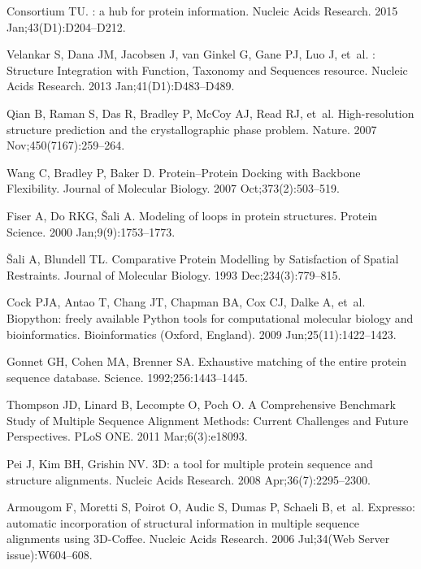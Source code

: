 \documentclass[10pt,letterpaper]{article}
\begin{document}
\begin{thebibliography}{100}
Consortium TU.
: a hub for protein information.
\newblock Nucleic Acids Research. 2015 Jan;43(D1):D204--D212.

Velankar S, Dana JM, Jacobsen J, van Ginkel G, Gane PJ, Luo J, et~al.
: {Structure} {Integration} with {Function}, {Taxonomy} and
  {Sequences} resource.
\newblock Nucleic Acids Research. 2013 Jan;41(D1):D483--D489.

Qian B, Raman S, Das R, Bradley P, McCoy AJ, Read RJ, et~al.
\newblock High-resolution structure prediction and the crystallographic phase
  problem.
\newblock Nature. 2007 Nov;450(7167):259--264.

Wang C, Bradley P, Baker D.
\newblock Protein–{Protein} {Docking} with {Backbone} {Flexibility}.
\newblock Journal of Molecular Biology. 2007 Oct;373(2):503--519.

Fiser A, Do RKG, {\v{S}ali} A.
\newblock Modeling of loops in protein structures.
\newblock Protein Science. 2000 Jan;9(9):1753--1773.

{\v{S}ali} A, Blundell TL.
\newblock Comparative {Protein} {Modelling} by {Satisfaction} of {Spatial}
  {Restraints}.
\newblock Journal of Molecular Biology. 1993 Dec;234(3):779--815.

Cock PJA, Antao T, Chang JT, Chapman BA, Cox CJ, Dalke A, et~al.
\newblock Biopython: freely available {Python} tools for computational
  molecular biology and bioinformatics.
\newblock Bioinformatics (Oxford, England). 2009 Jun;25(11):1422--1423.

Gonnet GH, Cohen MA, Brenner SA.
\newblock Exhaustive matching of the entire protein sequence database.
\newblock Science. 1992;256:1443--1445.

Thompson JD, Linard B, Lecompte O, Poch O.
\newblock A {Comprehensive} {Benchmark} {Study} of {Multiple} {Sequence}
  {Alignment} {Methods}: {Current} {Challenges} and {Future} {Perspectives}.
\newblock PLoS ONE. 2011 Mar;6(3):e18093.

Pei J, Kim BH, Grishin NV.
3D: a tool for multiple protein sequence and structure
  alignments.
\newblock Nucleic Acids Research. 2008 Apr;36(7):2295--2300.

Armougom F, Moretti S, Poirot O, Audic S, Dumas P, Schaeli B, et~al.
\newblock Expresso: automatic incorporation of structural information in
  multiple sequence alignments using 3D-{Coffee}.
\newblock Nucleic Acids Research. 2006 Jul;34(Web Server issue):W604--608.


\end{thebibliography}
\end{document}

